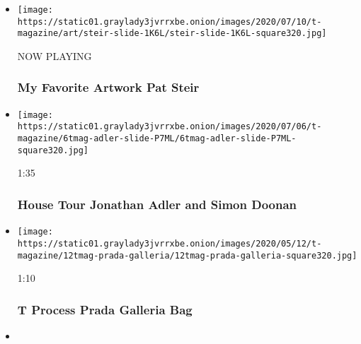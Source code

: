 \begin{itemize}
\item
  \texttt{[image: https://static01.graylady3jvrrxbe.onion/images/2020/07/10/t-magazine/art/steir-slide-1K6L/steir-slide-1K6L-square320.jpg]}

  NOW PLAYING

  \hypertarget{my-favorite-artwork--pat-steir-2}{%
  \subsubsection{My Favorite Artwork \textbar{} Pat
  Steir}\label{my-favorite-artwork--pat-steir-2}}
\item
  \href{https://www.nytimes3xbfgragh.onion/video/t-magazine/100000007212774/house-tour-jonathan-adler-and-simon-doonan.html?action=click\&module=video-series-bar\&region=header\&pgtype=Article\&playlistId=video/t-magazine}{}

  \texttt{[image: https://static01.graylady3jvrrxbe.onion/images/2020/07/06/t-magazine/6tmag-adler-slide-P7ML/6tmag-adler-slide-P7ML-square320.jpg]}

  1:35

  \hypertarget{house-tour--jonathan-adler-and-simon-doonan}{%
  \subsubsection{House Tour \textbar{} Jonathan Adler and Simon
  Doonan}\label{house-tour--jonathan-adler-and-simon-doonan}}
\item
  \href{https://www.nytimes3xbfgragh.onion/video/t-magazine/100000007129787/t-process-prada-galleria-bag.html?action=click\&module=video-series-bar\&region=header\&pgtype=Article\&playlistId=video/t-magazine}{}

  \texttt{[image: https://static01.graylady3jvrrxbe.onion/images/2020/05/12/t-magazine/12tmag-prada-galleria/12tmag-prada-galleria-square320.jpg]}

  1:10

  \hypertarget{t-process--prada-galleria-bag}{%
  \subsubsection{T Process \textbar{} Prada Galleria
  Bag}\label{t-process--prada-galleria-bag}}
\item
  \href{https://www.nytimes3xbfgragh.onion/video/t-magazine/100000007075532/butches-and-studs-in-their-own-words.html?action=click\&module=video-series-bar\&region=header\&pgtype=Article\&playlistId=video/t-magazine}{}


\end{itemize}
